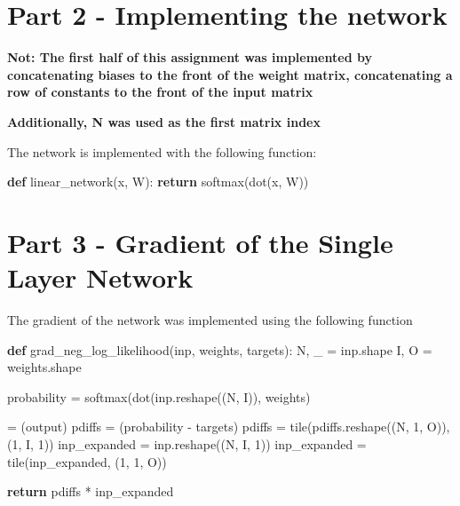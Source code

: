 \documentclass[]{article}
\newenvironment{Shaded}{}{}
\newcommand{\KeywordTok}[1]{\textcolor[rgb]{0.00,0.44,0.13}{\textbf{{#1}}}}
\newcommand{\DecValTok}[1]{\textcolor[rgb]{0.25,0.63,0.44}{{#1}}}
\newcommand{\ControlFlowTok}[1]{\textcolor[rgb]{0.00,0.44,0.13}{\textbf{{#1}}}}
\newcommand{\OperatorTok}[1]{\textcolor[rgb]{0.40,0.40,0.40}{{#1}}}
\newcommand{\NormalTok}[1]{{#1}}
\begin{document}
\section{Part 2 - Implementing the
 network}\label{part-2---implementing-the-network}

\textbf{Not: The first half of this assignment was implemented by
	concatenating biases to the front of the weight matrix, concatenating a
row of constants to the front of the input matrix}

\textbf{Additionally, N was used as the first matrix index}

The network is implemented with the following function:

\begin{Shaded}
	\begin{Highlighting}[]
		\KeywordTok{def} \NormalTok{linear_network(x, W):}
		\ControlFlowTok{return} \NormalTok{softmax(dot(x, W))}
	\end{Highlighting}
\end{Shaded}

\section{Part 3 - Gradient of the Single Layer
 Network}\label{part-3---gradient-of-the-single-layer-network}

The gradient of the network was implemented using the following function

\begin{Shaded}
	\begin{Highlighting}[]
		\KeywordTok{def} \NormalTok{grad_neg_log_likelihood(inp, weights, targets):}
		\NormalTok{N, _ }\OperatorTok{=} \NormalTok{inp.shape}
		\NormalTok{I, O }\OperatorTok{=} \NormalTok{weights.shape}
		
		\NormalTok{probability }\OperatorTok{=} \NormalTok{softmax(dot(inp.reshape((N, I)), weights)}
		
		\OperatorTok{=} \NormalTok{(output)}
		\NormalTok{pdiffs }\OperatorTok{=} \NormalTok{(probability }\OperatorTok{-} \NormalTok{targets)}
		\NormalTok{pdiffs }\OperatorTok{=} \NormalTok{tile(pdiffs.reshape((N, }\DecValTok{1}\NormalTok{, O)), (}\DecValTok{1}\NormalTok{, I, }\DecValTok{1}\NormalTok{))}
		\NormalTok{inp_expanded }\OperatorTok{=} \NormalTok{inp.reshape((N, I, }\DecValTok{1}\NormalTok{))}
		\NormalTok{inp_expanded }\OperatorTok{=} \NormalTok{tile(inp_expanded, (}\DecValTok{1}\NormalTok{, }\DecValTok{1}\NormalTok{, O))}
		
		\ControlFlowTok{return} \NormalTok{pdiffs }\OperatorTok{*} \NormalTok{inp_expanded}
	\end{Highlighting}
\end{Shaded}
\end{document}

